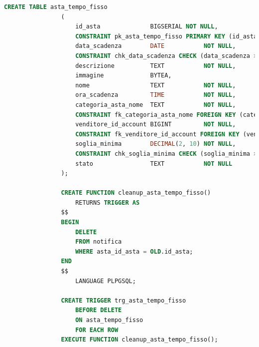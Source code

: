             \begin{lstlisting}[language=SQL, caption=Relazione asta a tempo fisso]
                CREATE TABLE asta_tempo_fisso
                (
                    id_asta              BIGSERIAL NOT NULL,
                    CONSTRAINT pk_asta_tempo_fisso PRIMARY KEY (id_asta),
                    data_scadenza        DATE           NOT NULL,
                    CONSTRAINT chk_data_scadenza CHECK (data_scadenza > NOW()),
                    descrizione          TEXT           NOT NULL,
                    immagine             BYTEA,
                    nome                 TEXT           NOT NULL,
                    ora_scadenza         TIME           NOT NULL,
                    categoria_asta_nome  TEXT           NOT NULL,
                    CONSTRAINT fk_categoria_asta_nome FOREIGN KEY (categoria_asta_nome) REFERENCES categoria_asta (nome) ON UPDATE CASCADE ON DELETE CASCADE,
                    venditore_id_account BIGINT         NOT NULL,
                    CONSTRAINT fk_venditore_id_account FOREIGN KEY (venditore_id_account) REFERENCES venditore (id_account) ON UPDATE CASCADE ON DELETE CASCADE,
                    soglia_minima        DECIMAL(2, 10) NOT NULL,
                    CONSTRAINT chk_soglia_minima CHECK (soglia_minima >= 0),
                    stato                TEXT           NOT NULL
                );
                
                CREATE FUNCTION cleanup_asta_tempo_fisso()
                    RETURNS TRIGGER AS
                $$
                BEGIN
                    DELETE
                    FROM notifica
                    WHERE asta_id_asta = OLD.id_asta;
                END
                $$
                    LANGUAGE PLPGSQL;
                
                CREATE TRIGGER trg_asta_tempo_fisso
                    BEFORE DELETE
                    ON asta_tempo_fisso
                    FOR EACH ROW
                EXECUTE FUNCTION cleanup_asta_tempo_fisso();
            \end{lstlisting}
            
